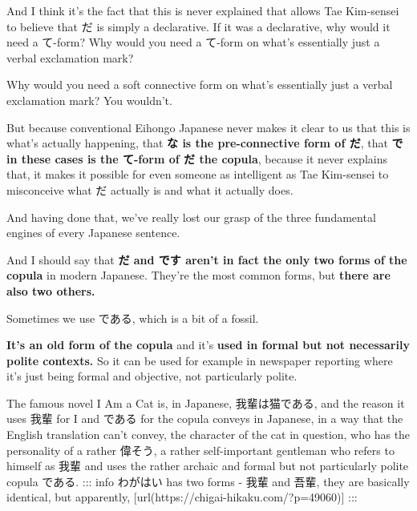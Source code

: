 And I think it's the fact that this is never explained that allows Tae Kim-sensei to believe that だ is simply a declarative. If it was a declarative, why would it need a て-form? Why would you need a て-form on what's essentially just a verbal exclamation mark?

Why would you need a soft connective form on what's essentially just a verbal exclamation mark? You wouldn't.

But because conventional Eihongo Japanese never makes it clear to us that this is what's actually happening, that {\bf な is the pre-connective form of だ}, that {\bf で in these cases is the て-form of だ the copula}, because it never explains that, it makes it possible for even someone as intelligent as Tae Kim-sensei to misconceive what だ actually is and what it actually does.

And having done that, we've really lost our grasp of the three fundamental engines of every Japanese sentence.

And I should say that {\bf だ and です aren't in fact the only two forms of the copula} in modern Japanese. They're the most common forms, but {\bf there are also two others.}

\stopsectionlevel

\startsectionlevel[title={である copula form},reference={である-copula-form}]

Sometimes we use である, which is a bit of a fossil.

{}

{\bf It's an old form of the copula} and it's {\bf used in formal but not necessarily polite contexts.} So it can be used for example in newspaper reporting where it's just being formal and objective, not particularly polite.

The famous novel I Am a Cat is, in Japanese, 我輩は猫である, and the reason it uses 我輩 for I and である for the copula conveys in Japanese, in a way that the English translation can't convey, the character of the cat in question, who has the personality of a rather 偉そう, a rather self-important gentleman who refers to himself as 我輩 and uses the rather archaic and formal but not particularly polite copula である. ::: info わがはい has two forms - 我輩 and 吾輩, they are basically identical, but apparently,\crlf
{}[url(https://chigai-hikaku.com/?p=49060)] :::

\stopsectionlevel


